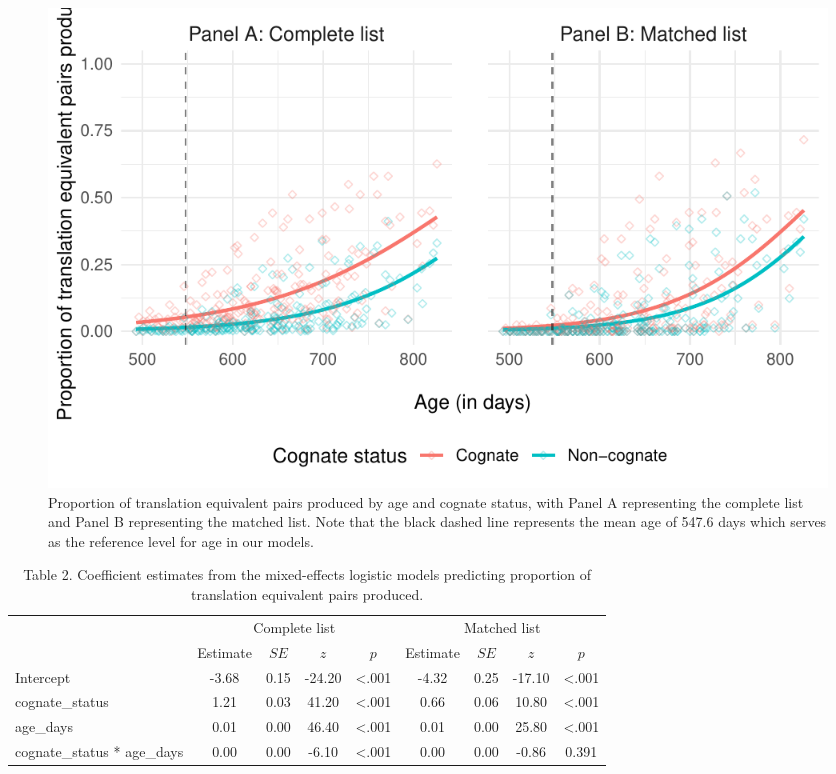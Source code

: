 \documentclass[
  english,
  ,man,floatsintext]{apa6}
\begin{document}
\begin{figure}

{\centering \includegraphics[width=1.2\linewidth]{CogVocab_paper_files/figure-latex/Fig2-1} 

}

\caption{Proportion of translation equivalent pairs produced by age and cognate status, with Panel A representing the complete list and Panel B representing the matched list. Note that the black dashed line represents the mean age of 547.6 days which serves as the reference level for age in our models.}\label{fig:Fig2}
\end{figure}

\begin{table}[tbp]

\begin{center}
\begin{threeparttable}

\caption{\label{tab:Table 2}Table 2. Coefficient estimates from the mixed-effects logistic models predicting proportion of translation equivalent pairs produced.}

\begin{tabular}{lcccccccc}
\toprule
 & \multicolumn{4}{c}{Complete list} & \multicolumn{4}{c}{Matched list} \\
\cmidrule(r){2-5} \cmidrule(r){6-9}
 & Estimate & $SE$ & $z$ & $p$ & Estimate & $SE$ & $z$ & $p$\\
\midrule
Intercept & -3.68 & 0.15 & -24.20 & <.001 & -4.32 & 0.25 & -17.10 & <.001\\
cognate\_status & 1.21 & 0.03 & 41.20 & <.001 & 0.66 & 0.06 & 10.80 & <.001\\
age\_days & 0.01 & 0.00 & 46.40 & <.001 & 0.01 & 0.00 & 25.80 & <.001\\
cognate\_status * age\_days & 0.00 & 0.00 & -6.10 & <.001 & 0.00 & 0.00 & -0.86 & 0.391\\
\bottomrule
\end{tabular}

\end{threeparttable}
\end{center}

\end{table}
\end{document}
